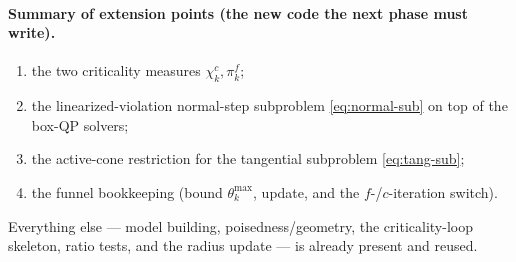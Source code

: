 \paragraph{Summary of extension points (the new code the next phase must write).}
\begin{enumerate}\itemsep1pt
  \item the two criticality measures $\chi_k^c,\pi_k^f$;
  \item the linearized-violation normal-step subproblem \eqref{eq:normal-sub} on
        top of the box-QP solvers;
  \item the active-cone restriction for the tangential subproblem \eqref{eq:tang-sub};
  \item the funnel bookkeeping (bound $\theta_k^{\max}$, update, and the
        $f$-/$c$-iteration switch).
\end{enumerate}
Everything else --- model building, poisedness/geometry, the criticality-loop
skeleton, ratio tests, and the radius update --- is already present and reused.
